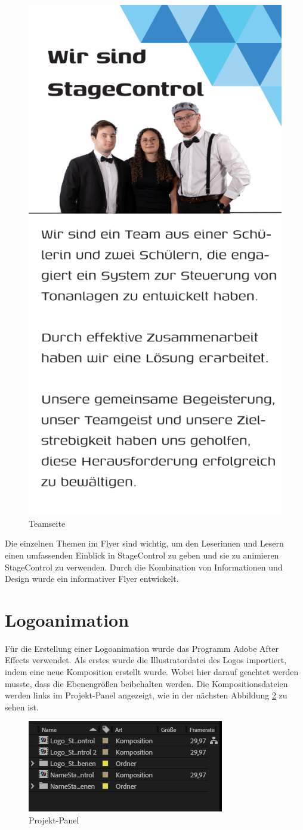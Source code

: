 \begin{figure}[H]
	\centering
	\includegraphics[width=0.5\linewidth]{images/Teamseite.png}
	\caption[Teamseite]{Teamseite}
	\label{fig:Teamseite}
\end{figure} 

Die einzelnen Themen im Flyer sind wichtig, um den Leserinnen und Lesern einen umfassenden Einblick in StageControl zu geben und sie zu animieren StageControl zu verwenden. Durch die Kombination von Informationen und Design wurde ein informativer Flyer entwickelt. 

\section{Logoanimation}
Für die Erstellung einer Logoanimation wurde das Programm Adobe After Effects verwendet. Als erstes wurde die Illustratordatei des Logos importiert, indem eine neue Komposition erstellt wurde. Wobei hier darauf geachtet werden musste, dass die Ebenengrößen beibehalten werden. Die Kompositionsdateien werden links im Projekt-Panel angezeigt, wie in der nächsten Abbildung \ref{fig:Projekt-Panel} zu sehen ist.

\begin{figure}[H]
	\centering
	\includegraphics[width=0.5\linewidth]{images/Projekt-Panel.png}
	\caption[Projekt-Panel]{Projekt-Panel}
	\label{fig:Projekt-Panel}
\end{figure} 


